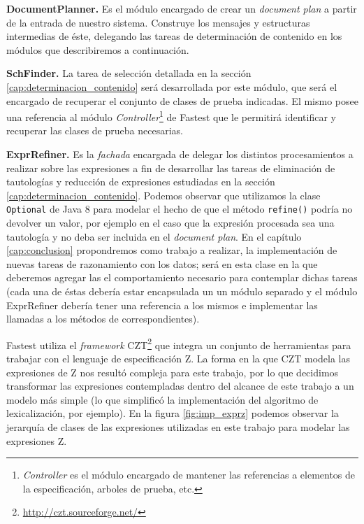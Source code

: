 \bigskip
\noindent
\textbf{DocumentPlanner.} Es el módulo encargado de crear un \textit{document plan} a partir de la entrada de nuestro sistema. Construye los mensajes y estructuras intermedias de éste, delegando las tareas de determinación de contenido en los módulos que describiremos a continuación.

\bigskip
\noindent
\textbf{SchFinder.} La tarea de selección detallada en la sección \ref{cap:determinacion_contenido} será desarrollada por este módulo, que será el encargado de recuperar el conjunto de clases de prueba indicadas. El mismo posee una referencia al módulo \textit{Controller}\footnote{\textit{Controller} es el módulo encargado de mantener las referencias a elementos de la especificación, arboles de prueba, etc.} de Fastest que le permitirá identificar y recuperar las clases de prueba necesarias. 


\bigskip
\noindent
\textbf{ExprRefiner.} Es la \textit{fachada} \cite{gof} encargada de delegar los distintos procesamientos a realizar sobre las expresiones a fin de desarrollar las tareas de eliminación de tautologías y reducción de expresiones estudiadas en la sección \ref{cap:determinacion_contenido}. Podemos observar que utilizamos la clase \texttt{Optional} de Java 8 para modelar el hecho de que el método \texttt{refine()} podría no devolver un valor, por ejemplo en el caso que la expresión procesada sea una tautología y no deba ser incluida en el \textit{document plan}. En el capítulo \ref{cap:conclusion} propondremos como trabajo a realizar, la implementación de nuevas tareas de razonamiento con los datos; será en esta clase en la que deberemos agregar las el comportamiento necesario para contemplar dichas tareas (cada una de éstas debería estar encapsulada un un módulo separado y el módulo ExprRefiner debería tener una referencia a los mismos e implementar las llamadas a los métodos de correspondientes).

\bigskip
Fastest utiliza el \textit{framework} CZT\footnote{\url{http://czt.sourceforge.net/}} que integra un conjunto de herramientas para trabajar con el lenguaje de especificación Z. La forma en la que CZT modela las expresiones de Z nos resultó compleja para este trabajo, por lo que decidimos transformar las expresiones contempladas dentro del alcance de este trabajo a un modelo más simple (lo que simplificó la implementación del algoritmo de lexicalización, por ejemplo). En la figura \ref{fig:imp_exprz} podemos observar la jerarquía de clases de las expresiones utilizadas en este trabajo para modelar las expresiones Z. 


